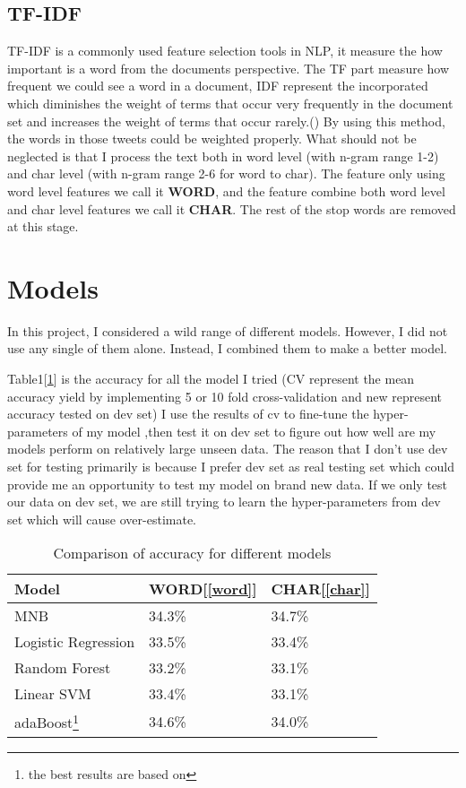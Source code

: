 \documentclass[11pt]{article}
\begin{document}
\subsection{TF-IDF}
TF-IDF is a commonly used feature selection tools in NLP, it measure
the how important is a word from the documents perspective. 
The TF part measure how frequent we could see a word in a document, 
IDF represent the incorporated which diminishes the weight of terms that 
occur very frequently in the document set and increases the 
weight of terms that occur rarely.()
By using this method, the words in those tweets could be weighted
properly. What should not be neglected is that I process the text both
in word level (with n-gram range 1-2) and char level (with n-gram range 2-6 for word to char).
The feature only using word level features we call it \textbf{WORD}\label{word}, and the feature combine both word level
and char level features we call it \textbf{CHAR}\label{char}.
The rest of the stop words are removed at this stage. 

\section{Models}
\label{models}
In this project, I considered a wild range of different models. However, I did not
use any single of them alone. Instead, I combined them to
make a better model.

Table1[\ref{accuracy}] is the accuracy for all the model I tried (CV represent the mean accuracy
yield by implementing 5 or 10 fold cross-validation and new represent accuracy tested on dev set)
I use the results of cv to fine-tune the hyper-parameters of my model 
,then test it on dev set to figure out how well are my models perform
on relatively large unseen data. The reason that I don't use dev set for
testing primarily is because I prefer dev set as real testing set which 
could provide me an opportunity to test my model on brand new data. If 
we only test our data on dev set, we are still trying to learn the
hyper-parameters from dev set which will cause over-estimate.

\begin{table}[h]
  \begin{center}
 \begin{tabular}{|l|l|l|}
 
       \hline
       Model & WORD[\ref{word}] & CHAR[\ref{char}]\\
       \hline\hline
       MNB & 34.3\% & 34.7\% \\
       Logistic Regression & 33.5\% & 33.4\% \\
       Random Forest & 33.2\% & 33.1\% \\
       Linear SVM & 33.4\% & 33.1\% \\
       adaBoost\footnote{the best results are based on } & 34.6\% & 34.0\% \\
       \hline
 
 \end{tabular}
 \caption{Comparison of accuracy for different models}\label{accuracy}
  \end{center}
 \end{table}
\end{document}

